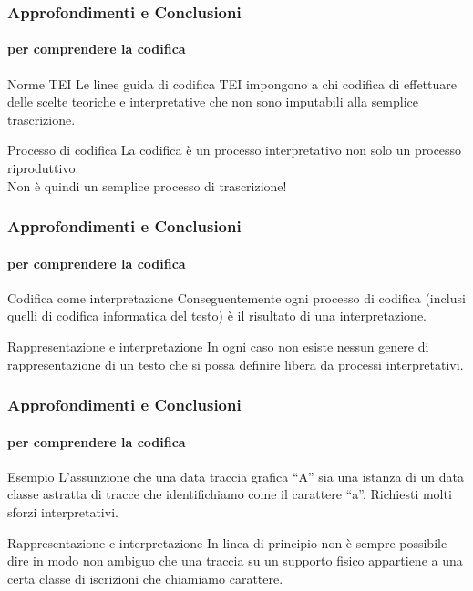 \begin{frame}
	\frametitle{Approfondimenti e Conclusioni}
	\framesubtitle{per comprendere la codifica}
	\addtocounter{nframe}{1}

	\begin{block}{Norme TEI}
		Le linee guida di codifica TEI impongono a chi codifica di effettuare delle scelte teoriche e interpretative che non sono imputabili alla semplice trascrizione.
    \end{block}
    
    \begin{block}{Processo di codifica}
        La codifica è un processo interpretativo non solo un processo riproduttivo.
        \\Non è quindi un semplice processo di trascrizione!
    \end{block}
    

\end{frame}


\begin{frame}
	\frametitle{Approfondimenti e Conclusioni}
	\framesubtitle{per comprendere la codifica}
	\addtocounter{nframe}{1}

	\begin{block}{Codifica come interpretazione}
		Conseguentemente ogni processo di codifica (inclusi quelli di codifica informatica del testo) è il risultato di una interpretazione.
    \end{block}
    
    \begin{block}{Rappresentazione e interpretazione}
        In ogni caso non esiste nessun genere di rappresentazione di un testo che si possa definire libera da processi interpretativi.
    \end{block}

\end{frame}

\begin{frame}
	\frametitle{Approfondimenti e Conclusioni}
	\framesubtitle{per comprendere la codifica}
	\addtocounter{nframe}{1}

	\begin{block}{Esempio}
		L’assunzione che una data traccia grafica ``A'' sia una istanza di un data classe astratta di tracce che identifichiamo come il carattere ``a''. Richiesti molti sforzi interpretativi.
    \end{block}
    
    \begin{block}{Rappresentazione e interpretazione}
        In linea di principio non è sempre possibile dire in modo non ambiguo che una traccia su un supporto fisico appartiene a una certa classe di iscrizioni che chiamiamo carattere.
    \end{block}

\end{frame}


